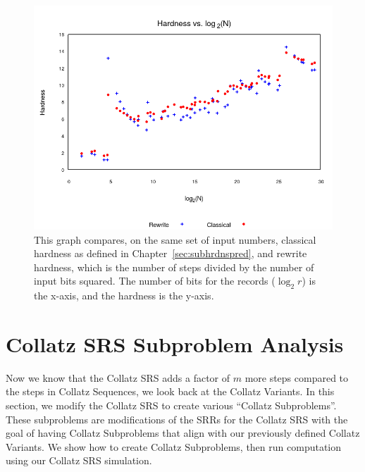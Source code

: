 \begin{figure}
    \centering
    \includegraphics[scale=0.75]{ModAvoidanceAnalysisPics/RvC_vs_log.png}
    \caption{This graph compares, on the same set of input numbers, classical hardness as defined in Chapter~\ref{sec:subhrdnspred}, and rewrite hardness, which is the number of steps divided by the number of input bits squared. The number of bits for the records ($\log_2{r}$) is the x-axis, and the hardness is the y-axis.}
    \label{fig:rvc_log}
\end{figure}


\section{Collatz SRS Subproblem Analysis} \label{subsec:collatzsubproblemananalysis}
Now we know that the Collatz SRS adds a factor of $m$ more steps compared to the steps in Collatz Sequences, we look back at the Collatz Variants. In this section, we modify the Collatz SRS to create various ``Collatz Subproblems''. These subproblems are modifications of the SRRs for the Collatz SRS with the goal of having Collatz Subproblems that align with our previously defined Collatz Variants. We show how to create Collatz Subproblems, then run computation using our Collatz SRS simulation.

